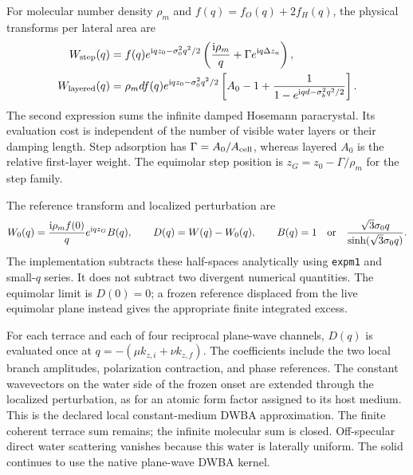 For molecular number density $\rho_m$ and $f(q)=f_O(q)+2f_H(q)$, the physical
transforms per lateral area are
\begin{align}
 W_{\rm step}(q)&=f(q)e^{\mathrm{i} qz_0-\sigma_0^2q^2/2}
    \left(\frac{\mathrm{i}\rho_m}{q}+\Gamma e^{\mathrm{i} q\Delta z_a}\right),\\
 W_{\rm layered}(q)&=\rho_m d f(q)e^{\mathrm{i} qz_0-\sigma_0^2q^2/2}
    \left[A_0-1+\frac{1}{1-e^{\mathrm{i} qd-\sigma_b^2q^2/2}}\right].
\end{align}
The second expression sums the infinite damped Hosemann paracrystal.  Its
evaluation cost is independent of the number of visible water layers or their
damping length. Step adsorption has $\Gamma=A_0/A_{\rm cell}$, whereas layered
$A_0$ is the relative first-layer weight. The equimolar step position is
$z_G=z_0-\Gamma/\rho_m$ for the step family.

The reference transform and localized perturbation are
\begin{equation}
 W_0(q)=\frac{\mathrm{i}\rho_m f(0)}{q}e^{\mathrm{i} qz_G}B(q),\qquad
 D(q)=W(q)-W_0(q),\qquad
 B(q)=1\quad\hbox{or}\quad
 \frac{\sqrt{3}\sigma_0 q}{\sinh(\sqrt{3}\sigma_0 q)}.
\end{equation}
The implementation subtracts these half-spaces analytically using
\texttt{expm1} and small-$q$ series. It does not subtract two divergent numerical
quantities. The equimolar limit is $D(0)=0$; a frozen reference displaced from
the live equimolar plane instead gives the appropriate finite integrated excess.

For each terrace and each of four reciprocal plane-wave channels, $D(q)$ is
evaluated once at $q=-(\mu k_{z,i}+\nu k_{z,f})$. The coefficients include the
two local branch amplitudes, polarization contraction, and phase references.
The constant wavevectors on the water side of the frozen onset are extended
through the localized perturbation, as for an atomic form factor assigned to
its host medium. This is the declared local constant-medium DWBA approximation.
The finite coherent terrace sum remains; the infinite molecular sum is closed.
Off-specular direct water scattering vanishes because this water is laterally
uniform. The solid continues to use the native plane-wave DWBA kernel.

